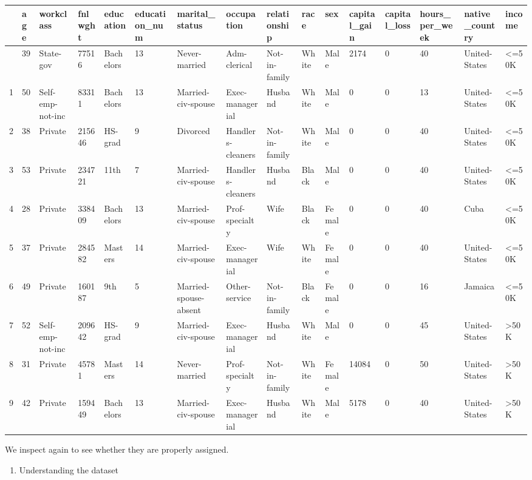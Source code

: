 \documentclass[
  letterpaper,
  DIV=11,
  numbers=noendperiod]{scrartcl}
\providecommand{\tightlist}{%
  \setlength{\itemsep}{0pt}\setlength{\parskip}{0pt}}
\begin{document}
\begin{longtable}[]{@{}llllllllllllllll@{}}
\toprule\noalign{}
& age & workclass & fnlwght & education & education\_num &
marital\_status & occupation & relationship & race & sex & capital\_gain
& capital\_loss & hours\_per\_week & native\_country & income \\
\midrule\noalign{}
\endhead
\bottomrule\noalign{}
\endlastfoot
0 & 39 & State-gov & 77516 & Bachelors & 13 & Never-married &
Adm-clerical & Not-in-family & White & Male & 2174 & 0 & 40 &
United-States & \textless=50K \\
1 & 50 & Self-emp-not-inc & 83311 & Bachelors & 13 & Married-civ-spouse
& Exec-managerial & Husband & White & Male & 0 & 0 & 13 & United-States
& \textless=50K \\
2 & 38 & Private & 215646 & HS-grad & 9 & Divorced & Handlers-cleaners &
Not-in-family & White & Male & 0 & 0 & 40 & United-States &
\textless=50K \\
3 & 53 & Private & 234721 & 11th & 7 & Married-civ-spouse &
Handlers-cleaners & Husband & Black & Male & 0 & 0 & 40 & United-States
& \textless=50K \\
4 & 28 & Private & 338409 & Bachelors & 13 & Married-civ-spouse &
Prof-specialty & Wife & Black & Female & 0 & 0 & 40 & Cuba &
\textless=50K \\
5 & 37 & Private & 284582 & Masters & 14 & Married-civ-spouse &
Exec-managerial & Wife & White & Female & 0 & 0 & 40 & United-States &
\textless=50K \\
6 & 49 & Private & 160187 & 9th & 5 & Married-spouse-absent &
Other-service & Not-in-family & Black & Female & 0 & 0 & 16 & Jamaica &
\textless=50K \\
7 & 52 & Self-emp-not-inc & 209642 & HS-grad & 9 & Married-civ-spouse &
Exec-managerial & Husband & White & Male & 0 & 0 & 45 & United-States &
\textgreater50K \\
8 & 31 & Private & 45781 & Masters & 14 & Never-married & Prof-specialty
& Not-in-family & White & Female & 14084 & 0 & 50 & United-States &
\textgreater50K \\
9 & 42 & Private & 159449 & Bachelors & 13 & Married-civ-spouse &
Exec-managerial & Husband & White & Male & 5178 & 0 & 40 & United-States
& \textgreater50K \\
\end{longtable}

We inspect again to see whether they are properly assigned.

\begin{enumerate}
\def\labelenumi{\arabic{enumi}.}
\setcounter{enumi}{1}
\tightlist
\item
  Understanding the dataset
\end{enumerate}
\end{document}
